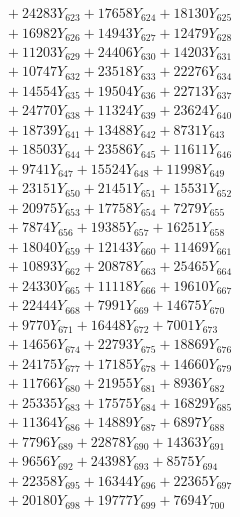\documentclass[a4paper,10pt]{article}
\begin{document}
{\begin{align}
&\;  + 24283 Y_{623} + 17658 Y_{624} + 18130 Y_{625} \\[0.3ex]
&\;  + 16982 Y_{626} + 14943 Y_{627} + 12479 Y_{628} \\[0.5ex]\allowbreak
&\;  + 11203 Y_{629} + 24406 Y_{630} + 14203 Y_{631} \\[0.3ex]
&\;  + 10747 Y_{632} + 23518 Y_{633} + 22276 Y_{634} \\[0.3ex]
&\;  + 14554 Y_{635} + 19504 Y_{636} + 22713 Y_{637} \\[0.3ex]
&\;  + 24770 Y_{638} + 11324 Y_{639} + 23624 Y_{640} \\[0.3ex]
&\;  + 18739 Y_{641} + 13488 Y_{642} + 8731 Y_{643} \\[0.3ex]
&\;  + 18503 Y_{644} + 23586 Y_{645} + 11611 Y_{646} \\[0.3ex]
&\;  + 9741 Y_{647} + 15524 Y_{648} + 11998 Y_{649} \\[0.3ex]
&\;  + 23151 Y_{650} + 21451 Y_{651} + 15531 Y_{652} \\[0.3ex]
&\;  + 20975 Y_{653} + 17758 Y_{654} + 7279 Y_{655} \\[0.3ex]
&\;  + 7874 Y_{656} + 19385 Y_{657} + 16251 Y_{658} \\[0.5ex]\allowbreak
&\;  + 18040 Y_{659} + 12143 Y_{660} + 11469 Y_{661} \\[0.3ex]
&\;  + 10893 Y_{662} + 20878 Y_{663} + 25465 Y_{664} \\[0.3ex]
&\;  + 24330 Y_{665} + 11118 Y_{666} + 19610 Y_{667} \\[0.3ex]
&\;  + 22444 Y_{668} + 7991 Y_{669} + 14675 Y_{670} \\[0.3ex]
&\;  + 9770 Y_{671} + 16448 Y_{672} + 7001 Y_{673} \\[0.3ex]
&\;  + 14656 Y_{674} + 22793 Y_{675} + 18869 Y_{676} \\[0.3ex]
&\;  + 24175 Y_{677} + 17185 Y_{678} + 14660 Y_{679} \\[0.3ex]
&\;  + 11766 Y_{680} + 21955 Y_{681} + 8936 Y_{682} \\[0.3ex]
&\;  + 25335 Y_{683} + 17575 Y_{684} + 16829 Y_{685} \\[0.3ex]
&\;  + 11364 Y_{686} + 14889 Y_{687} + 6897 Y_{688} \\[0.5ex]\allowbreak
&\;  + 7796 Y_{689} + 22878 Y_{690} + 14363 Y_{691} \\[0.3ex]
&\;  + 9656 Y_{692} + 24398 Y_{693} + 8575 Y_{694} \\[0.3ex]
&\;  + 22358 Y_{695} + 16344 Y_{696} + 22365 Y_{697} \\[0.3ex]
&\;  + 20180 Y_{698} + 19777 Y_{699} + 7694 Y_{700} \\[0.3ex]

\end{align}}
\end{document}
